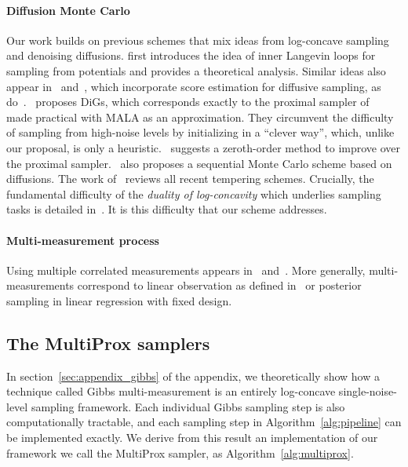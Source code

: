 \paragraph{Diffusion Monte Carlo} Our work builds on previous schemes that mix ideas from log-concave sampling and denoising diffusions.
\cite{huang_reverse_2024} first introduces the idea of inner Langevin loops for sampling from potentials and provides a theoretical analysis. Similar ideas also appear in~\cite{mcdonald_proposal_2022} and~\cite{vargas_denoising_2023}, which incorporate score estimation for diffusive sampling, as do~\cite{akhound-sadegh_iterated_2024}.~\cite{chen_diffusive_2024} proposes DiGs, which corresponds exactly to the proximal sampler of~\cite{shen_composite_2020} made practical with MALA as an approximation. They circumvent the difficulty of sampling from high-noise levels by initializing in a \enquote{clever way}, which, unlike our proposal, is only a heuristic.~\cite{he_zeroth-order_2024} suggests a zeroth-order method to improve over the proximal sampler.~\cite{phillips_particle_2024} also proposes a sequential Monte Carlo scheme based on diffusions. The work of~\cite{chehab_practical_2024} reviews all recent tempering schemes. Crucially, the fundamental difficulty of the \emph{duality of log-concavity} which underlies sampling tasks is detailed in~\cite{grenioux_stochastic_2024}. It is this difficulty that our scheme addresses.

\paragraph{Multi-measurement process} Using multiple correlated measurements appears in~\cite{saremi_multimeasurement_2022} and~\cite{saremi_chain_2024}. More generally, multi-measurements correspond to linear observation as defined in~\cite{montanari_posterior_2024} or posterior sampling in linear regression with fixed design.

\subsection{The MultiProx samplers}
In section~\ref{sec:appendix_gibbs} of the appendix, we theoretically show how a technique called Gibbs multi-measurement is an entirely log-concave single-noise-level sampling framework. Each individual Gibbs sampling step is also computationally tractable, and each sampling step in Algorithm~\ref{alg:pipeline} can be implemented exactly. We derive from this result an implementation of our framework we call the MultiProx sampler, as Algorithm~\ref{alg:multiprox}.

